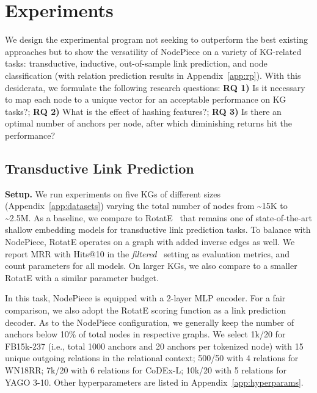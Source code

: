 \documentclass{article} \usepackage{iclr2022_conference,times}
\begin{document}
\section{Experiments}
\label{sec:experiments}

We design the experimental program not seeking to outperform the best existing approaches but to show the versatility of NodePiece on a variety of KG-related tasks: transductive, inductive, out-of-sample link prediction, and node classification (with relation prediction results in Appendix~\ref{app:rp}). 
With this desiderata, we formulate the following research questions: \textbf{RQ 1)} Is it necessary to map each node to a unique vector for an acceptable performance on KG tasks?; \textbf{RQ 2)} What is the effect of  hashing features?; \textbf{RQ 3)} Is there an optimal number of anchors per node, after which diminishing returns hit the performance?




\subsection{Transductive Link Prediction}
\textbf{Setup.} We run experiments on five KGs of different sizes (Appendix~\ref{app:datasets}) varying the total number of nodes from \textasciitilde{}15K to \textasciitilde{}2.5M. 
As a baseline, we compare to RotatE~\citep{DBLP:conf/iclr/SunDNT19} that remains one of state-of-the-art shallow embedding models for transductive link prediction tasks. 
To balance with NodePiece, RotatE operates on a graph with added inverse edges as well.
We report MRR with Hits@10 in the \emph{filtered}~\citep{DBLP:conf/nips/BordesUGWY13} setting as evaluation metrics, and count parameters for all models. 
On larger KGs, we also compare to a smaller RotatE with a similar parameter budget. 

In this task, NodePiece is equipped with a 2-layer MLP encoder.
For a fair comparison, we also adopt the RotatE scoring function as a link prediction decoder. 
As to the NodePiece configuration, we generally keep the number of anchors below 10\% of total nodes in respective graphs. 
We select 1k/20 for FB15k-237 (i.e., total 1000 anchors and 20 anchors per tokenized node) with 15 unique outgoing relations in the relational context; 500/50 with 4 relations for WN18RR; 7k/20 with 6 relations for CoDEx-L; 10k/20 with 5 relations for YAGO 3-10.
Other hyperparameters are listed in Appendix~\ref{app:hyperparams}.
\end{document}
